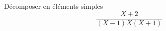 D{\'e}composer en {\'e}l{\'e}ments simples 
\begin{displaymath}
\frac{X+2}{(X-1)X(X+1)}  
\end{displaymath}
\bigskip \bigskip \bigskip